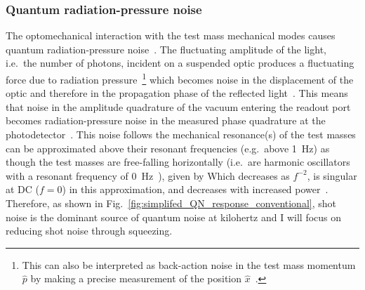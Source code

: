 \subsubsection{Quantum radiation-pressure noise}

The optomechanical interaction with the test mass mechanical modes causes quantum radiation-pressure noise~\cite{}.
The fluctuating amplitude of the light, i.e.\ the number of photons, incident on a suspended optic produces a fluctuating force due to radiation pressure~\footnote{This can also be interpreted as back-action noise in the test mass momentum $\hat p$ by making a precise measurement of the position $\hat x$~\cite{}.} which becomes noise in the displacement of the optic and therefore in the propagation phase of the reflected light~\cite{}. %
This means that noise in the amplitude quadrature of the vacuum entering the readout port becomes radiation-pressure noise in the measured phase quadrature at the photodetector~\cite{}.
This noise follows the mechanical resonance(s) of the test masses can be approximated above their resonant frequencies (e.g.\ above 1~Hz) as though the test masses are free-falling horizontally (i.e.\ are harmonic oscillators with a resonant frequency of 0~Hz~\cite{}), given by
Which decreases as $f^{-2}$, is singular at DC ($f=0$) in this approximation, and decreases with increased power~\cite{}. %
Therefore, as shown in Fig.~\ref{fig:simplifed_QN_response_conventional}, shot noise is the dominant source of quantum noise at kilohertz and I will focus on reducing shot noise through squeezing.

